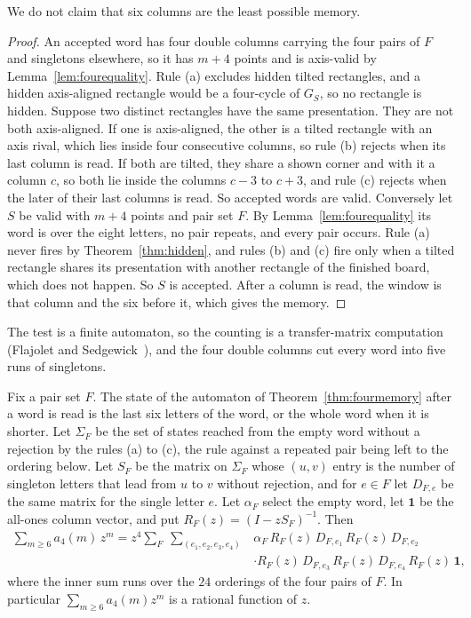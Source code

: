 We do not claim that six columns are the least possible memory.

\begin{proof}
An accepted word has four double columns carrying the four pairs of $F$ and singletons elsewhere, so it has $m+4$ points and is axis-valid by Lemma~\ref{lem:fourequality}. Rule (a) excludes hidden tilted rectangles, and a hidden axis-aligned rectangle would be a four-cycle of $G_S$, so no rectangle is hidden. Suppose two distinct rectangles have the same presentation. They are not both axis-aligned. If one is axis-aligned, the other is a tilted rectangle with an axis rival, which lies inside four consecutive columns, so rule (b) rejects when its last column is read. If both are tilted, they share a shown corner and with it a column $c$, so both lie inside the columns $c-3$ to $c+3$, and rule (c) rejects when the later of their last columns is read. So accepted words are valid. Conversely let $S$ be valid with $m+4$ points and pair set $F$. By Lemma~\ref{lem:fourequality} its word is over the eight letters, no pair repeats, and every pair occurs. Rule (a) never fires by Theorem~\ref{thm:hidden}, and rules (b) and (c) fire only when a tilted rectangle shares its presentation with another rectangle of the finished board, which does not happen. So $S$ is accepted. After a column is read, the window is that column and the six before it, which gives the memory.
\end{proof}

The test is a finite automaton, so the counting is a transfer-matrix computation (Flajolet and Sedgewick~\cite[Section~V.5]{flajolet2009}), and the four double columns cut every word into five runs of singletons.

\begin{theorem}\label{thm:fourgf}
Fix a pair set $F$. The state of the automaton of Theorem~\ref{thm:fourmemory} after a word is read is the last six letters of the word, or the whole word when it is shorter. Let $\Sigma_F$ be the set of states reached from the empty word without a rejection by the rules (a) to (c), the rule against a repeated pair being left to the ordering below. Let $S_F$ be the matrix on $\Sigma_F$ whose $(u,v)$ entry is the number of singleton letters that lead from $u$ to $v$ without rejection, and for $e\in F$ let $D_{F,e}$ be the same matrix for the single letter $e$. Let $\alpha_F$ select the empty word, let $\mathbf1$ be the all-ones column vector, and put $R_F(z)=(I-zS_F)^{-1}$. Then
\begin{equation}\label{eq:fiverun}
\begin{split}
\sum_{m\ge6}a_4(m)\,z^m=z^4\sum_F\ \sum_{(e_1,e_2,e_3,e_4)}&\alpha_F\,R_F(z)\,D_{F,e_1}\,R_F(z)\,D_{F,e_2}\\
&\cdot R_F(z)\,D_{F,e_3}\,R_F(z)\,D_{F,e_4}\,R_F(z)\,\mathbf1,
\end{split}
\end{equation}
where the inner sum runs over the $24$ orderings of the four pairs of $F$. In particular $\sum_{m\ge6}a_4(m)z^m$ is a rational function of $z$.
\end{theorem}

